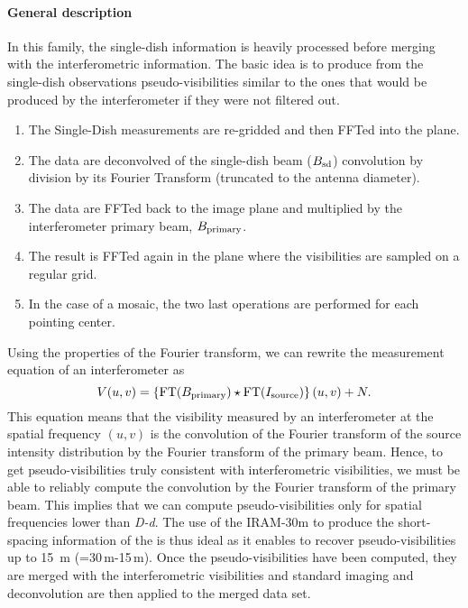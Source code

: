 \paragraph{General description}

In this family, the single-dish information is heavily processed before
merging with the interferometric information. The basic idea is to produce
from the single-dish observations pseudo-visibilities similar to the ones
that would be produced by the interferometer if they were not filtered out.
\begin{enumerate}\itemsep 0pt
\item The Single-Dish measurements are re-gridded and then FFTed into the
  \uv{} plane.
\item The data are deconvolved of the single-dish beam ($B_{\mathrm{sd}}$)
  convolution by division by its Fourier Transform (truncated to the
  antenna diameter).
\item The data are FFTed back to the image plane and multiplied by the
  interferometer primary beam, $B_{\mathrm{primary}}$.
\item The result is FFTed again in the \uv{} plane where the visibilities
  are sampled on a regular grid.
\item In the case of a mosaic, the two last operations are performed for
  each pointing center.
\end{enumerate}
Using the properties of the Fourier transform, we can rewrite the
measurement equation of an interferometer as
\begin{equation}
  V(u,v) = \displaystyle\left\{ \mbox{FT}(B_{\mathrm{primary}}) \star \mbox{FT}(I_{\mathrm{source}}) \right\}(u,v)+N.
\end{equation}
This equation means that the visibility measured by an interferometer at
the spatial frequency $(u,v)$ is the convolution of the Fourier transform
of the source intensity distribution by the Fourier transform of the
primary beam. Hence, to get pseudo-visibilities truly consistent with
interferometric visibilities, we must be able to reliably compute the
convolution by the Fourier transform of the primary beam. This implies that
we can compute pseudo-visibilities only for spatial frequencies lower than
\textit{D-d}. The use of the IRAM-30m to produce the short-spacing information of
the \NOEMA{} is thus ideal as it enables to recover pseudo-visibilities up
to 15~m (=30\,\mbox{m}-15\,\mbox{m}). Once the pseudo-visibilities have
been computed, they are merged with the interferometric visibilities and
standard imaging and deconvolution are then applied to the merged data set.


